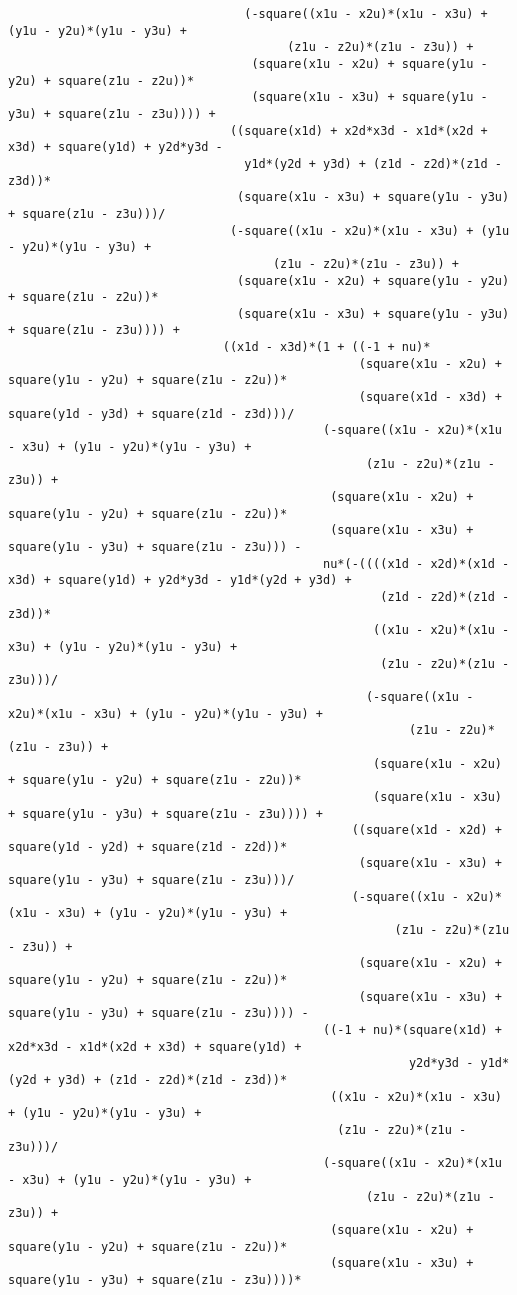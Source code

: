 \begin{lstlisting}
								 (-square((x1u - x2u)*(x1u - x3u) + (y1u - y2u)*(y1u - y3u) + 
									   (z1u - z2u)*(z1u - z3u)) + 
								  (square(x1u - x2u) + square(y1u - y2u) + square(z1u - z2u))*
								  (square(x1u - x3u) + square(y1u - y3u) + square(z1u - z3u)))) + 
							   ((square(x1d) + x2d*x3d - x1d*(x2d + x3d) + square(y1d) + y2d*y3d - 
								 y1d*(y2d + y3d) + (z1d - z2d)*(z1d - z3d))*
								(square(x1u - x3u) + square(y1u - y3u) + square(z1u - z3u)))/
							   (-square((x1u - x2u)*(x1u - x3u) + (y1u - y2u)*(y1u - y3u) + 
									 (z1u - z2u)*(z1u - z3u)) + 
								(square(x1u - x2u) + square(y1u - y2u) + square(z1u - z2u))*
								(square(x1u - x3u) + square(y1u - y3u) + square(z1u - z3u)))) + 
							  ((x1d - x3d)*(1 + ((-1 + nu)*
												 (square(x1u - x2u) + square(y1u - y2u) + square(z1u - z2u))*
												 (square(x1d - x3d) + square(y1d - y3d) + square(z1d - z3d)))/
											(-square((x1u - x2u)*(x1u - x3u) + (y1u - y2u)*(y1u - y3u) + 
												  (z1u - z2u)*(z1u - z3u)) + 
											 (square(x1u - x2u) + square(y1u - y2u) + square(z1u - z2u))*
											 (square(x1u - x3u) + square(y1u - y3u) + square(z1u - z3u))) - 
											nu*(-((((x1d - x2d)*(x1d - x3d) + square(y1d) + y2d*y3d - y1d*(y2d + y3d) + 
													(z1d - z2d)*(z1d - z3d))*
												   ((x1u - x2u)*(x1u - x3u) + (y1u - y2u)*(y1u - y3u) + 
													(z1u - z2u)*(z1u - z3u)))/
												  (-square((x1u - x2u)*(x1u - x3u) + (y1u - y2u)*(y1u - y3u) + 
														(z1u - z2u)*(z1u - z3u)) + 
												   (square(x1u - x2u) + square(y1u - y2u) + square(z1u - z2u))*
												   (square(x1u - x3u) + square(y1u - y3u) + square(z1u - z3u)))) + 
												((square(x1d - x2d) + square(y1d - y2d) + square(z1d - z2d))*
												 (square(x1u - x3u) + square(y1u - y3u) + square(z1u - z3u)))/
												(-square((x1u - x2u)*(x1u - x3u) + (y1u - y2u)*(y1u - y3u) + 
													  (z1u - z2u)*(z1u - z3u)) + 
												 (square(x1u - x2u) + square(y1u - y2u) + square(z1u - z2u))*
												 (square(x1u - x3u) + square(y1u - y3u) + square(z1u - z3u)))) - 
											((-1 + nu)*(square(x1d) + x2d*x3d - x1d*(x2d + x3d) + square(y1d) + 
														y2d*y3d - y1d*(y2d + y3d) + (z1d - z2d)*(z1d - z3d))*
											 ((x1u - x2u)*(x1u - x3u) + (y1u - y2u)*(y1u - y3u) + 
											  (z1u - z2u)*(z1u - z3u)))/
											(-square((x1u - x2u)*(x1u - x3u) + (y1u - y2u)*(y1u - y3u) + 
												  (z1u - z2u)*(z1u - z3u)) + 
											 (square(x1u - x2u) + square(y1u - y2u) + square(z1u - z2u))*
											 (square(x1u - x3u) + square(y1u - y3u) + square(z1u - z3u))))*

\end{lstlisting}
